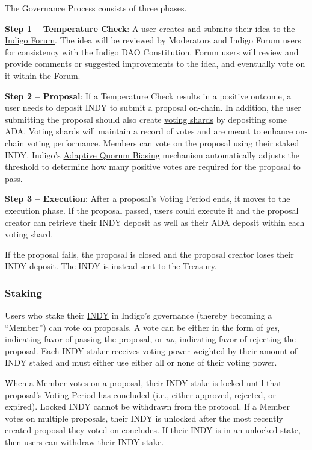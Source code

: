 \documentclass{article}
\begin{document}
\begin{sloppypar}
The Governance Process consists of three phases.

\textbf{Step 1 -- Temperature Check}: A user creates and submits their
idea to the \href{https://forum.indigoprotocol.io/}{Indigo Forum}. The
idea will be reviewed by Moderators and Indigo Forum users for
consistency with the Indigo DAO Constitution. Forum users will review
and provide comments or suggested improvements to the idea, and
eventually vote on it within the Forum.

\textbf{Step 2 -- Proposal}: If a Temperature Check results in a
positive outcome, a user needs to deposit INDY to submit a proposal
on-chain. In addition, the user submitting the proposal should also
create \protect\hyperlink{governance-sharding}{voting shards} by
depositing some ADA. Voting shards will maintain a record of votes and
are meant to enhance on-chain voting performance. Members can vote on
the proposal using their staked INDY. Indigo's
\protect\hyperlink{adaptive-quorum-biasing}{Adaptive Quorum Biasing}
mechanism automatically adjusts the threshold to determine how many
positive votes are required for the proposal to pass.

\textbf{Step 3 -- Execution}: After a proposal's Voting Period ends, it
moves to the execution phase. If the proposal passed, users could
execute it and the proposal creator can retrieve their INDY deposit as
well as their ADA deposit within each voting shard.

If the proposal fails, the proposal is closed and the proposal creator
loses their INDY deposit. The INDY is instead sent to the
\protect\hyperlink{indigo-dao-treasury}{Treasury}.

\hypertarget{staking}{%
\subsubsection{Staking}\label{staking}}

Users who stake their \protect\hyperlink{indy}{INDY} in Indigo's
governance (thereby becoming a ``Member'') can vote on proposals. A vote
can be either in the form of \emph{yes}, indicating favor of passing the
proposal, or \emph{no}, indicating favor of rejecting the proposal. Each
INDY staker receives voting power weighted by their amount of INDY
staked and must either use either all or none of their voting power.

When a Member votes on a proposal, their INDY stake is locked until that
proposal's Voting Period has concluded (i.e., either approved, rejected,
or expired). Locked INDY cannot be withdrawn from the protocol. If a
Member votes on multiple proposals, their INDY is unlocked after the
most recently created proposal they voted on concludes. If their INDY is
in an unlocked state, then users can withdraw their INDY stake.


\end{sloppypar}
\end{document}

